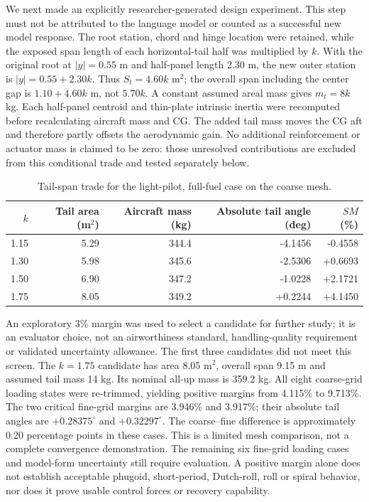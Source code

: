 We next made an explicitly researcher-generated design experiment. This step
must not be attributed to the language model or counted as a successful new
model response. The root station, chord and hinge location were retained,
while the exposed span length of each horizontal-tail half was multiplied by
$k$. With the original root at $|y|=0.55$ m and half-panel length 2.30 m, the
new outer station is $|y|=0.55+2.30k$. Thus $S_t=4.60k$ m$^2$; the overall
span including the center gap is $1.10+4.60k$ m, not $5.70k$. A constant
assumed areal mass gives $m_t=8k$ kg. Each half-panel centroid and thin-plate
intrinsic inertia were recomputed before recalculating aircraft mass and CG.
The added tail mass moves the CG aft and therefore partly offsets the
aerodynamic gain. No additional reinforcement or actuator mass is claimed to
be zero: those unresolved contributions are excluded from this conditional
trade and tested separately below.

\begin{table}[htbp]
\centering\small
\caption{Tail-span trade for the light-pilot, full-fuel case on the coarse mesh.}
\label{tab:tail-span-trade}
\begin{tabular}{rrrrr}
\toprule
$k$ & Tail area (m$^2$) & Aircraft mass (kg) & Absolute tail angle (deg) & $SM$ (\%)\\
\midrule
1.15 & 5.29 & 344.4 & -4.1456 & -0.4558\\
1.30 & 5.98 & 345.6 & -2.5306 & +0.6693\\
1.50 & 6.90 & 347.2 & -1.0228 & +2.1721\\
1.75 & 8.05 & 349.2 & +0.2244 & +4.1450\\
\bottomrule
\end{tabular}
\end{table}

An exploratory 3\% margin was used to select a candidate for further study;
it is an evaluator choice, not an airworthiness standard, handling-quality
requirement or validated uncertainty allowance. The first three candidates
did not meet this screen. The $k=1.75$ candidate has area 8.05 m$^2$, overall
span 9.15 m and assumed tail mass 14 kg. Its nominal all-up mass is 359.2 kg.
All eight coarse-grid loading states were re-trimmed, yielding positive
margins from 4.115\% to 9.713\%. The two critical fine-grid margins are
3.946\% and 3.917\%; their absolute tail angles are $+0.28375^\circ$ and
$+0.32297^\circ$. The coarse--fine difference is approximately 0.20 percentage
points in these cases. This is a limited mesh comparison, not a complete
convergence demonstration. The remaining six fine-grid loading cases and
model-form uncertainty still require evaluation. A positive margin alone
does not establish acceptable phugoid, short-period, Dutch-roll, roll or spiral
behavior, nor does it prove usable control forces or recovery capability.

